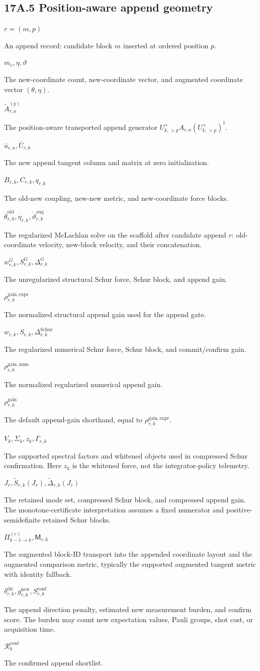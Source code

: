 \documentclass[10pt]{article}
\newcommand{\sym}[2]{%
  \noindent\begin{minipage}[t]{0.29\textwidth}\raggedright\textbf{\ensuremath{#1}}\end{minipage}%
  \hfill
  \begin{minipage}[t]{0.68\textwidth}\raggedright #2\end{minipage}\par\vspace{0.22em}}
\begin{document}
\subsection*{17A.5 Position-aware append geometry}

\sym{r=(m,p)}{An append record: candidate block $m$ inserted at ordered position $p$.}
\sym{m_r,\eta,\vartheta}{The new-coordinate count, new-coordinate vector, and augmented coordinate vector $(\theta,\eta)$.}
\sym{\widetilde A_{r,a}^{(p)}}{The position-aware transported append generator $U_{k,>p}^{+}A_{r,a}(U_{k,>p}^{+})^\dagger$.}
\sym{\bar u_{r,a},\bar U_{r,k}}{The new append tangent column and matrix at zero initialization.}
\sym{B_{r,k},C_{r,k},q_{r,k}}{The old-new coupling, new-new metric, and new-coordinate force blocks.}
\sym{\dot\theta_{r,k}^{\mathrm{old}},\dot\eta_{r,k},\dot\vartheta_{r,k}^{\mathrm{aug}}}{The regularized McLachlan solve on the scaffold after candidate append $r$: old-coordinate velocity, new-block velocity, and their concatenation.}
\sym{w_{r,k}^{G},S_{r,k}^{G},\Delta_{r,k}^{G}}{The unregularized structural Schur force, Schur block, and append gain.}
\sym{\rho_{r,k}^{\mathrm{gain,expr}}}{The normalized structural append gain used for the append gate.}
\sym{w_{r,k},S_{r,k},\Delta_{r,k}^{\mathrm{Schur}}}{The regularized numerical Schur force, Schur block, and commit/confirm gain.}
\sym{\rho_{r,k}^{\mathrm{gain,num}}}{The normalized regularized numerical append gain.}
\sym{\rho_{r,k}^{\mathrm{gain}}}{The default append-gain shorthand, equal to $\rho_{r,k}^{\mathrm{gain,expr}}$.}
\sym{V_k,\Sigma_k,z_k,\Gamma_{r,k}}{The supported spectral factors and whitened objects used in compressed Schur confirmation. Here $z_k$ is the whitened force, not the integrator-policy telemetry.}
\sym{J_r,\widetilde S_{r,k}(J_r),\widetilde\Delta_{r,k}(J_r)}{The retained mode set, compressed Schur block, and compressed append gain. The monotone-certificate interpretation assumes a fixed numerator and positive-semidefinite retained Schur blocks.}
\sym{\Pi_{k-1\to k}^{(r)},\mathsf M_{r,k}}{The augmented block-ID transport into the appended coordinate layout and the augmented comparison metric, typically the supported augmented tangent metric with identity fallback.}
\sym{\delta_{r,k}^{\mathrm{dir}},g_{r,k}^{\mathrm{new}},S_{r,k}^{\mathrm{conf}}}{The append direction penalty, estimated new measurement burden, and confirm score. The burden may count new expectation values, Pauli groups, shot cost, or acquisition time.}
\sym{\mathcal R_k^{\mathrm{conf}}}{The confirmed append shortlist.}
\end{document}
